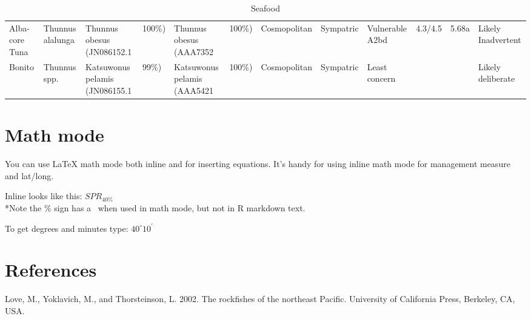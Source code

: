 \documentclass[12pt,]{article}
\begin{document}
\begin{table}[ht]
{\begin{tabular}{llllllllllll}
  Alba-core Tuna & Thunnus alalunga & Thunnus obesus (JN086152.1 &  100\%) & Thunnus obesus (AAA7352 &  100\%) & Cosmopolitan & Sympatric & Vulnerable A2bd & 4.3/4.5 & 5.68a & Likely Inadvertent \\ 
  Bonito & Thunnus spp. & Katsuwonus pelamis (JN086155.1 &  99\%) & Katsuwonus pelamis (AAA5421 &  100\%) & Cosmopolitan & Sympatric & Least concern &  &  & Likely deliberate \\ 
   \hline
\end{tabular}
}
\caption{Seafood} 
\label{seafood}
\end{table}

\section{Math mode}\label{math-mode}

You can use LaTeX math mode both inline and for inserting equations.
It's handy for using inline math mode for management measure and
lat/long.

Inline looks like this: \(SPR_{40\%}\)\\
*Note the \% sign has a ~when used in math mode, but not in R markdown
text.

To get degrees and minutes type: \(40^\circ 10^\prime\)

\section*{References}\label{references}

\hypertarget{refs}{}
\hypertarget{ref-Love2002}{}
Love, M., Yoklavich, M., and Thorsteinson, L. 2002. The rockfishes of
the northeast Pacific. University of California Press, Berkeley, CA,
USA.
\end{document}
